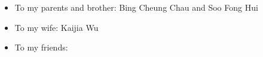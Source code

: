 
\cleardoublepage

\begin{dedication}

\begin{itemize}
 \vspace*{3mm}
 \item To my parents and brother: Bing Cheung Chau and Soo Fong Hui
 \vspace*{3mm}
 \item To my wife: Kaijia Wu
 \vspace*{3mm}
 \item To my friends:
\end{itemize}

\end{dedication}
